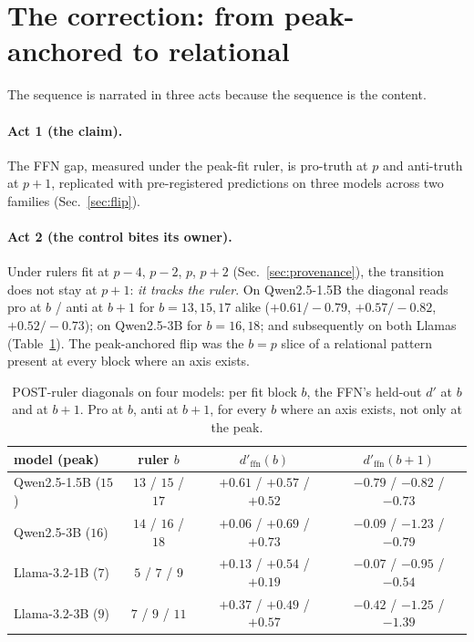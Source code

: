 \documentclass[11pt]{article}
\begin{document}
\section{The correction: from peak-anchored to relational}
\label{sec:correction}

The sequence is narrated in three acts because the sequence is the content.

\paragraph{Act 1 (the claim).} The FFN gap, measured under the peak-fit
ruler, is pro-truth at $p$ and anti-truth at $p{+}1$, replicated with
pre-registered predictions on three models across two families
(Sec.~\ref{sec:flip}).

\paragraph{Act 2 (the control bites its owner).} Under rulers fit at
$p{-}4$, $p{-}2$, $p$, $p{+}2$ (Sec.~\ref{sec:provenance}), the transition
does not stay at $p{+}1$: \emph{it tracks the ruler}. On Qwen2.5-1.5B the
diagonal reads pro at $b$ / anti at $b{+}1$ for $b = 13, 15, 17$ alike
($+0.61/-0.79$, $+0.57/-0.82$, $+0.52/-0.73$); on Qwen2.5-3B for
$b = 16, 18$; and subsequently on both Llamas (Table~\ref{tab:post}). The
peak-anchored flip was the $b{=}p$ slice of a relational pattern present at
every block where an axis exists.

\begin{table}[H]
\centering
\caption{POST-ruler diagonals on four models: per fit block $b$, the FFN's
held-out $d'$ at $b$ and at $b{+}1$. Pro at $b$, anti at $b{+}1$, for every
$b$ where an axis exists, not only at the peak.}
\label{tab:post}
\begin{tabular}{lccc}
\toprule
model (peak) & ruler $b$ & $d'_{\mathrm{ffn}}(b)$ & $d'_{\mathrm{ffn}}(b{+}1)$ \\
\midrule
Qwen2.5-1.5B ($15$) & $13$ / $15$ / $17$ & $+0.61$ / $+0.57$ / $+0.52$ & $-0.79$ / $-0.82$ / $-0.73$ \\
Qwen2.5-3B ($16$)   & $14$ / $16$ / $18$ & $+0.06$ / $+0.69$ / $+0.73$ & $-0.09$ / $-1.23$ / $-0.79$ \\
Llama-3.2-1B ($7$)  & $5$ / $7$ / $9$    & $+0.13$ / $+0.54$ / $+0.19$ & $-0.07$ / $-0.95$ / $-0.54$ \\
Llama-3.2-3B ($9$)  & $7$ / $9$ / $11$   & $+0.37$ / $+0.49$ / $+0.57$ & $-0.42$ / $-1.25$ / $-1.39$ \\
\bottomrule
\end{tabular}
\end{table}
\end{document}
